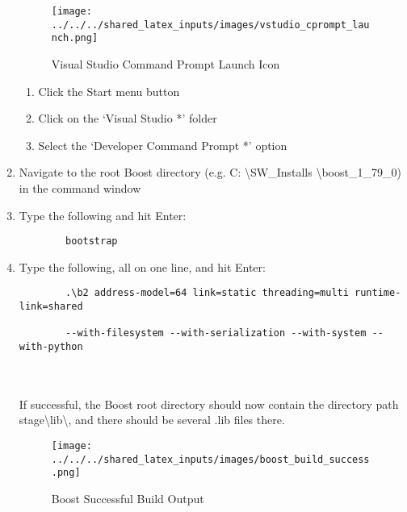 \begin{enumerate}
\begin{figure}[H]
			\centering
			\texttt{[image: ../../../shared\_latex\_inputs/images/vstudio\_cprompt\_launch.png]}
			\caption{Visual Studio Command Prompt Launch Icon}
		\end{figure}
	\begin{enumerate}
		\item Click the Start menu button
		\item Click on the `Visual Studio *' folder 
		\item Select the `Developer Command Prompt *' option
	\end{enumerate}
	\item Navigate to the root Boost directory (e.g. C: \textbackslash SW\_Installs \textbackslash boost\_1\_79\_0) in the command window
	\item Type the following and hit Enter:
	\begin{verbatim}
		bootstrap
	\end{verbatim}	
	\item Type the following, all on one line, and hit Enter:
	\begin{verbatim}
		.\b2 address-model=64 link=static threading=multi runtime-link=shared 
		
		--with-filesystem --with-serialization --with-system --with-python
	\end{verbatim} \\ \\
	If successful, the Boost root directory should now contain the directory path stage\textbackslash lib\textbackslash, and there should be several .lib files there. 
	\begin{figure}[H]
		\centering
		\texttt{[image: ../../../shared\_latex\_inputs/images/boost\_build\_success.png]}
		\caption{Boost Successful Build Output}
	\end{figure}
\end{enumerate}

